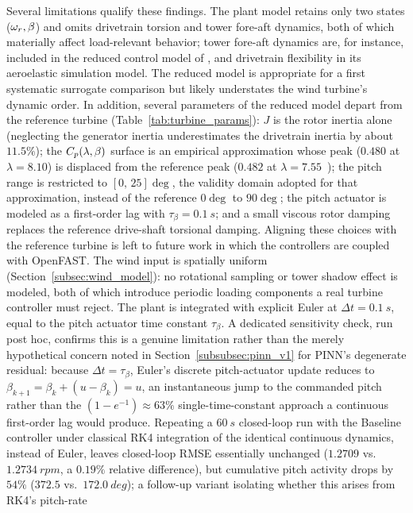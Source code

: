 Several limitations qualify these findings. {\color{auditP2}The plant model retains only
two states ($\omega_r,\beta$) and omits drivetrain torsion and tower
fore-aft dynamics, both of which materially affect load-relevant
behavior; tower fore-aft dynamics are, for instance, included in the
reduced control model of \cite{schlipf2013}, and drivetrain flexibility
in its aeroelastic simulation model. The reduced model is appropriate
for a first systematic surrogate comparison but likely understates the
wind turbine's dynamic order. In addition, several parameters of the reduced model depart from the
reference turbine (Table~\ref{tab:turbine_params}): $J$ is the rotor inertia
alone (neglecting the generator inertia underestimates the drivetrain inertia
by about $11.5\%$); the $C_p(\lambda,\beta)$ surface is an empirical
approximation whose peak ($0.480$ at $\lambda=8.10$) is displaced from the
reference peak ($0.482$ at $\lambda=7.55$~\cite{jonkman2009}); the pitch range
is restricted to $[0,\,25]\deg$, the validity domain adopted for that
approximation, instead of the reference $0\deg$ to $90\deg$; the pitch
actuator is modeled as a first-order lag with $\tau_\beta=\SI{0.1}{s}$; and a
small viscous rotor damping replaces the reference drive-shaft torsional
damping. Aligning these choices with the reference turbine is left to future
work in which the controllers are coupled with OpenFAST.}
The wind input is spatially uniform (Section~\ref{subsec:wind_model}):
no rotational sampling or tower shadow effect is modeled, both of which
introduce periodic loading components a real turbine controller must
reject. The plant is integrated with explicit Euler at
$\Delta t=\SI{0.1}{s}$, equal to the pitch actuator time constant
$\tau_\beta$. A dedicated sensitivity check, run post hoc, confirms
this is a genuine limitation rather than the merely hypothetical
concern noted in Section~\ref{subsubsec:pinn_v1} for PINN's
degenerate residual: because $\Delta t=\tau_\beta$, Euler's discrete
pitch-actuator update reduces to $\beta_{k+1}=\beta_k+(u-\beta_k)=u$,
an instantaneous jump to the commanded pitch rather than the
$(1-e^{-1})\approx63\%$ single-time-constant approach a continuous
first-order lag would produce. Repeating a $\SI{60}{s}$
closed-loop run with the Baseline controller under classical RK4
integration of the identical continuous dynamics, instead of Euler,
leaves closed-loop RMSE essentially unchanged ($1.2709$ vs.\
$\SI{1.2734}{rpm}$, a $0.19\%$ relative difference), but cumulative
pitch activity drops by $54\%$ ($372.5$ vs.\ $\SI{172.0}{deg}$); a
follow-up variant isolating whether this arises from RK4's pitch-rate
